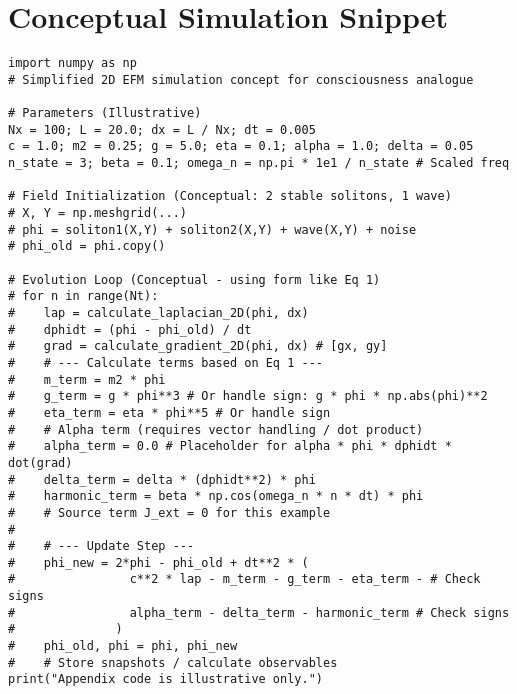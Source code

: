 \documentclass[11pt]{article}
\begin{document}
\section{Conceptual Simulation Snippet}
\begin{lstlisting}
import numpy as np
# Simplified 2D EFM simulation concept for consciousness analogue

# Parameters (Illustrative)
Nx = 100; L = 20.0; dx = L / Nx; dt = 0.005
c = 1.0; m2 = 0.25; g = 5.0; eta = 0.1; alpha = 1.0; delta = 0.05
n_state = 3; beta = 0.1; omega_n = np.pi * 1e1 / n_state # Scaled freq

# Field Initialization (Conceptual: 2 stable solitons, 1 wave)
# X, Y = np.meshgrid(...)
# phi = soliton1(X,Y) + soliton2(X,Y) + wave(X,Y) + noise
# phi_old = phi.copy()

# Evolution Loop (Conceptual - using form like Eq 1)
# for n in range(Nt):
#    lap = calculate_laplacian_2D(phi, dx)
#    dphidt = (phi - phi_old) / dt
#    grad = calculate_gradient_2D(phi, dx) # [gx, gy]
#    # --- Calculate terms based on Eq 1 ---
#    m_term = m2 * phi
#    g_term = g * phi**3 # Or handle sign: g * phi * np.abs(phi)**2
#    eta_term = eta * phi**5 # Or handle sign
#    # Alpha term (requires vector handling / dot product)
#    alpha_term = 0.0 # Placeholder for alpha * phi * dphidt * dot(grad)
#    delta_term = delta * (dphidt**2) * phi
#    harmonic_term = beta * np.cos(omega_n * n * dt) * phi
#    # Source term J_ext = 0 for this example
#
#    # --- Update Step ---
#    phi_new = 2*phi - phi_old + dt**2 * (
#                c**2 * lap - m_term - g_term - eta_term - # Check signs
#                alpha_term - delta_term - harmonic_term # Check signs
#              )
#    phi_old, phi = phi, phi_new
#    # Store snapshots / calculate observables
print("Appendix code is illustrative only.")
\end{lstlisting}
\end{document}
